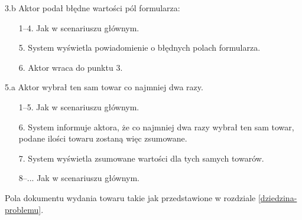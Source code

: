 \begin{usecase}
{    \item [3.b] Aktor podał błędne wartości pól formularza:
      \begin{enumerate}
        \item[1--4.] Jak w scenariuszu głównym.
        \item[5.] System wyświetla powiadomienie o błędnych polach formularza.
        \item[6.] Aktor wraca do punktu 3.
      \end{enumerate}
     \item[5.a] Aktor wybrał ten sam towar co najmniej dwa razy.
       \begin{enumerate}
       \item[1--5.] Jak w scenariuszu głównym.
       \item[6.] System informuje aktora, że co najmniej dwa razy wybrał ten sam towar, podane ilości towaru zostaną więc zsumowane.
       \item[7.] System wyświetla zsumowane wartości dla tych samych towarów.
       \item[8--...] Jak w scenariuszu głównym.
       \end{enumerate}
  }
   {
    Pola dokumentu wydania towaru takie jak przedstawione w rozdziale \ref{dziedzina-problemu}.
  }
\end{usecase}

